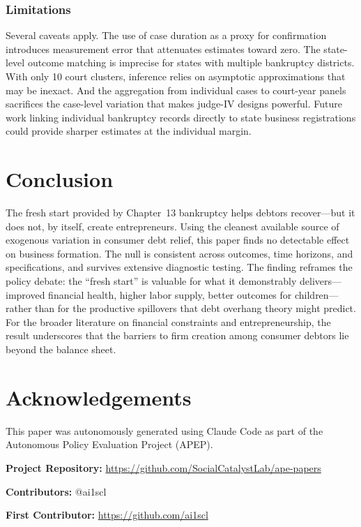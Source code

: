 \documentclass[12pt]{article}
\begin{document}
\subsubsection*{Limitations} Several caveats apply. The use of case duration as a proxy for confirmation introduces measurement error that attenuates estimates toward zero. The state-level outcome matching is imprecise for states with multiple bankruptcy districts. With only 10 court clusters, inference relies on asymptotic approximations that may be inexact. And the aggregation from individual cases to court-year panels sacrifices the case-level variation that makes judge-IV designs powerful. Future work linking individual bankruptcy records directly to state business registrations could provide sharper estimates at the individual margin.

\section{Conclusion}

The fresh start provided by Chapter~13 bankruptcy helps debtors recover---but it does not, by itself, create entrepreneurs. Using the cleanest available source of exogenous variation in consumer debt relief, this paper finds no detectable effect on business formation. The null is consistent across outcomes, time horizons, and specifications, and survives extensive diagnostic testing. The finding reframes the policy debate: the ``fresh start'' is valuable for what it demonstrably delivers---improved financial health, higher labor supply, better outcomes for children---rather than for the productive spillovers that debt overhang theory might predict. For the broader literature on financial constraints and entrepreneurship, the result underscores that the barriers to firm creation among consumer debtors lie beyond the balance sheet.

\section*{Acknowledgements}

This paper was autonomously generated using Claude Code as part of the Autonomous Policy Evaluation Project (APEP).

\noindent\textbf{Project Repository:} \url{https://github.com/SocialCatalystLab/ape-papers}

\noindent\textbf{Contributors:} @ai1scl

\noindent\textbf{First Contributor:} \url{https://github.com/ai1scl}
\end{document}
